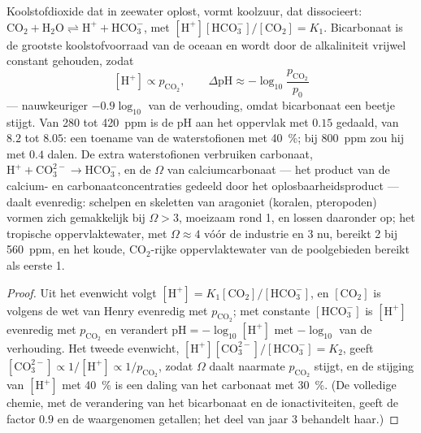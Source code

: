 \begin{theorem}[Verzuring]\label{thm:b2:global-change:acid}
Koolstofdioxide dat in zeewater oplost, vormt koolzuur, dat
dissocieert: $\ensuremath{\mathrm{CO_2}} + \ensuremath{\mathrm{H_2O}} \rightleftharpoons \ensuremath{\mathrm{H^{+}}} +
\ensuremath{\mathrm{HCO_3^{-}}}$, met $[\ensuremath{\mathrm{H^{+}}}][\ensuremath{\mathrm{HCO_3^{-}}}]/[\ensuremath{\mathrm{CO_2}}] = K_1$.
Bicarbonaat is de grootste koolstofvoorraad van de oceaan en wordt door de
alkaliniteit vrijwel constant gehouden, zodat
\[
[\ensuremath{\mathrm{H^{+}}}] \propto p_{\ensuremath{\mathrm{CO_2}}}, \qquad
\Delta\mathrm{pH} \approx -\log_{10}\frac{p_{\ensuremath{\mathrm{CO_2}}}}{p_0}
\]
--- nauwkeuriger $-0.9\log_{10}$ van de verhouding, omdat bicarbonaat
een beetje stijgt. Van 280 tot \qty{420}{ppm} is de pH aan het oppervlak
met $0.15$ gedaald, van $8.2$ tot $8.05$: een toename van de waterstofionen met
\qty{40}{\%}; bij \qty{800}{ppm} zou hij met $0.4$ dalen. De extra
waterstofionen verbruiken carbonaat, $\ensuremath{\mathrm{H^{+}}} + \ensuremath{\mathrm{CO_3^{2-}}} \to \ensuremath{\mathrm{HCO_3^{-}}}$, en
de \emph{} $\Omega$ van calciumcarbonaat ---
het product van de calcium- en carbonaatconcentraties gedeeld door het
oplosbaarheidsproduct --- daalt evenredig: schelpen en skeletten
van aragoniet (koralen, pteropoden) vormen zich gemakkelijk bij $\Omega > 3$,
moeizaam rond 1, en lossen daaronder op; het tropische oppervlaktewater,
met $\Omega \approx 4$ vóór de industrie en 3 nu, bereikt 2 bij
\qty{560}{ppm}, en het koude, \ensuremath{\mathrm{CO_2}}-rijke oppervlaktewater
van de poolgebieden bereikt als eerste 1.
\end{theorem}
\begin{proof}
Uit het evenwicht volgt $[\ensuremath{\mathrm{H^{+}}}] = K_1[\ensuremath{\mathrm{CO_2}}]/[\ensuremath{\mathrm{HCO_3^{-}}}]$, en
$[\ensuremath{\mathrm{CO_2}}]$ is volgens de wet van Henry evenredig met $p_{\ensuremath{\mathrm{CO_2}}}$;
met constante $[\ensuremath{\mathrm{HCO_3^{-}}}]$ is $[\ensuremath{\mathrm{H^{+}}}]$ evenredig met
$p_{\ensuremath{\mathrm{CO_2}}}$ en verandert $\mathrm{pH} = -\log_{10}[\ensuremath{\mathrm{H^{+}}}]$ met
$-\log_{10}$ van de verhouding. Het tweede evenwicht, $[\ensuremath{\mathrm{H^{+}}}][\ensuremath{\mathrm{CO_3^{2-}}}]/[\ensuremath{\mathrm{HCO_3^{-}}}]
= K_2$, geeft $[\ensuremath{\mathrm{CO_3^{2-}}}] \propto 1/[\ensuremath{\mathrm{H^{+}}}] \propto
1/p_{\ensuremath{\mathrm{CO_2}}}$, zodat $\Omega$ daalt naarmate $p_{\ensuremath{\mathrm{CO_2}}}$ stijgt, en
de stijging van $[\ensuremath{\mathrm{H^{+}}}]$ met \qty{40}{\%} is een daling van het carbonaat met
\qty{30}{\%}. (De volledige chemie, met de verandering van het bicarbonaat en
de ionactiviteiten, geeft de factor $0.9$ en de waargenomen
getallen; het deel van jaar 3 behandelt haar.)
\end{proof}
